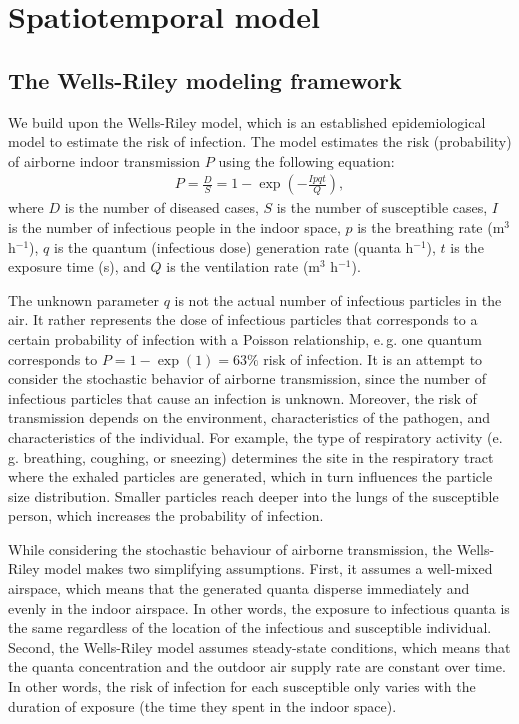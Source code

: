 \documentclass[fleqn,11pt]{wlscirep_supp}
\newcommand\eg{e.\,g.\xspace}
\begin{document}
\clearpage

\section{Spatiotemporal model}\label{sec:spattemp-model}

\subsection{The Wells-Riley modeling framework}

We build upon the Wells-Riley model\cite{Riley1978AJE}, which is an established epidemiological model to estimate the risk of infection. The model estimates the risk (probability) of airborne indoor transmission $P$ using the following equation: 
\begin{align}
    P = \frac{D}{S} = 1 - \exp \left(-\frac{Ipqt}{Q}\right),
\end{align}
where $D$ is the number of diseased cases, $S$ is the number of susceptible cases, $I$ is the number of infectious people in the indoor space, $p$ is the breathing rate (m$^3$ h$^{-1}$), $q$ is the quantum (infectious dose) generation rate (quanta h$^{-1}$), $t$ is the exposure time (s), and $Q$ is the ventilation rate (m$^3$ h$^{-1}$).

The unknown parameter $q$ is not the actual number of infectious particles in the air. It rather represents the dose of infectious particles that corresponds to a certain probability of infection with a Poisson relationship, \eg one quantum corresponds to $P = 1 - \exp (1) = 63\%$ risk of infection\cite{Rudnick2003IndoorAir}. It is an attempt to consider the stochastic behavior of airborne transmission, since the number of infectious particles that cause an infection is unknown. Moreover, the risk of transmission depends on the environment, characteristics of the pathogen, and characteristics of the individual. For example, the type of respiratory activity (\eg breathing, coughing, or sneezing) determines the site in the respiratory tract where the exhaled particles are generated, which in turn influences the particle size distribution\cite{Wei2016AMJIC}. Smaller particles reach deeper into the lungs of the susceptible person\cite{Wang2021Science}, which increases the probability of infection. 

While considering the stochastic behaviour of airborne transmission, the Wells-Riley model makes two simplifying assumptions. First, it assumes a well-mixed airspace, which means that the generated quanta disperse immediately and evenly in the indoor airspace. In other words, the exposure to infectious quanta is the same regardless of the location of the infectious and susceptible individual. Second, the Wells-Riley model assumes steady-state conditions, which means that the quanta concentration and the outdoor air supply rate are constant over time. In other words, the risk of infection for each susceptible only varies with the duration of exposure (the time they spent in the indoor space). 
\end{document}

